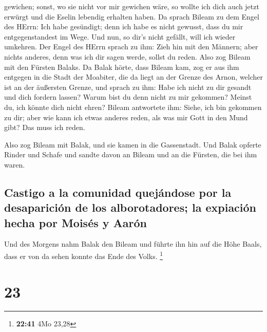 gewichen; sonst, wo sie nicht vor mir gewichen wäre, so wollte ich dich
auch jetzt erwürgt und die Eselin lebendig erhalten haben.
 Da sprach Bileam zu dem Engel des HErrn: Ich habe
gesündigt; denn ich habe es nicht gewusst, dass du mir entgegenstandest
im Wege. Und nun, so dir's nicht gefällt, will ich wieder umkehren.
 Der Engel des HErrn sprach zu ihm: Zieh hin mit den
Männern; aber nichts anderes, denn was ich dir sagen werde, sollst du
reden. Also zog Bileam mit den Fürsten Balaks.  Da Balak
hörte, dass Bileam kam, zog er aus ihm entgegen in die Stadt der
Moabiter, die da liegt an der Grenze des Arnon, welcher ist an der
äußersten Grenze,  und sprach zu ihm: Habe ich nicht zu
dir gesandt und dich fordern lassen? Warum bist du denn nicht zu mir
gekommen? Meinst du, ich könnte dich nicht ehren?  Bileam
antwortete ihm: Siehe, ich bin gekommen zu dir; aber wie kann ich etwas
anderes reden, als was mir Gott in den Mund gibt? Das muss ich reden.

 Also zog Bileam mit Balak, und sie kamen in die
Gassenstadt.  Und Balak opferte Rinder und Schafe und
sandte davon an Bileam und an die Fürsten, die bei ihm waren.

\hypertarget{castigo-a-la-comunidad-quejuxe1ndose-por-la-desapariciuxf3n-de-los-alborotadores-la-expiaciuxf3n-hecha-por-moisuxe9s-y-aaruxf3n}{%
\subsection{Castigo a la comunidad quejándose por la desaparición de los
alborotadores; la expiación hecha por Moisés y
Aarón}\label{castigo-a-la-comunidad-quejuxe1ndose-por-la-desapariciuxf3n-de-los-alborotadores-la-expiaciuxf3n-hecha-por-moisuxe9s-y-aaruxf3n}}

 Und des Morgens nahm Balak den Bileam und führte ihn hin
auf die Höhe Baals, dass er von da sehen konnte das Ende des Volks.
\footnote{\textbf{22:41} 4Mo 23,28}

\hypertarget{section-22}{%
\section{23}\label{section-22}}

